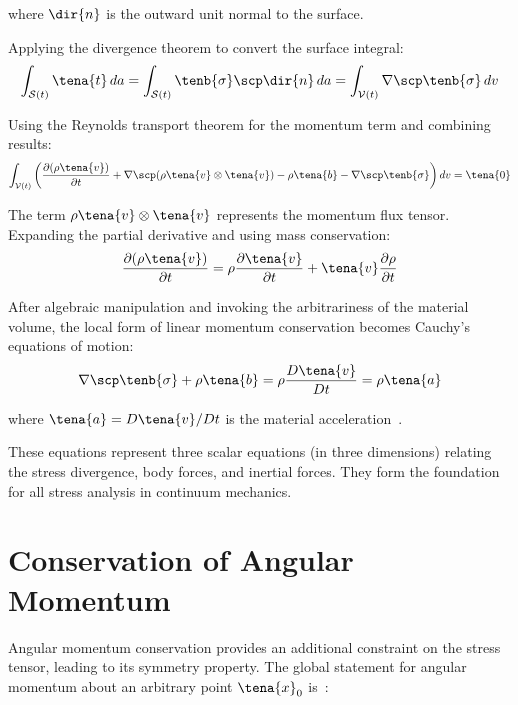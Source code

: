 where $\dir{n}$ is the outward unit normal to the surface.

Applying the divergence theorem to convert the surface integral:
\begin{equation}
\int_{\mathcal{S}(t)} \tena{t} \, da = \int_{\mathcal{S}(t)} \tenb{\sigma} \scp \dir{n} \, da = \int_{\mathcal{V}(t)} \nabla \scp \tenb{\sigma} \, dv
\end{equation}

Using the Reynolds transport theorem for the momentum term and combining results:
\begin{equation}
\int_{\mathcal{V}(t)} \left(\frac{\partial (\rho \tena{v})}{\partial t} + \nabla \scp (\rho \tena{v} \otimes \tena{v}) - \rho \tena{b} - \nabla \scp \tenb{\sigma}\right) dv = \tena{0}
\end{equation}

The term $\rho \tena{v} \otimes \tena{v}$ represents the momentum flux tensor. Expanding the partial derivative and using mass conservation:
\begin{equation}
\frac{\partial (\rho \tena{v})}{\partial t} = \rho \frac{\partial \tena{v}}{\partial t} + \tena{v} \frac{\partial \rho}{\partial t}
\end{equation}

After algebraic manipulation and invoking the arbitrariness of the material volume, the local form of linear momentum conservation becomes Cauchy's equations of motion:
\begin{equation}
\nabla \scp \tenb{\sigma} + \rho \tena{b} = \rho \frac{D\tena{v}}{Dt} = \rho \tena{a}
\end{equation}

where $\tena{a} = D\tena{v}/Dt$ is the material acceleration~\autocite{Sadd.2019}.

These equations represent three scalar equations (in three dimensions) relating the stress divergence, body forces, and inertial forces. They form the foundation for all stress analysis in continuum mechanics.

\section{Conservation of Angular Momentum}

Angular momentum conservation provides an additional constraint on the stress tensor, leading to its symmetry property. The global statement for angular momentum about an arbitrary point $\tena{x}_0$ is~\autocite{Sadd.2019}:

